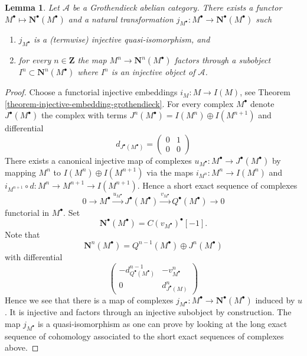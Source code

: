 \documentclass{amsart}
\theoremstyle{plain}
\newtheorem{lemma}[subsection]{Lemma}
\theoremstyle{definition}
\theoremstyle{remark}
\numberwithin{equation}{subsection}
\begin{document}
\begin{lemma}
\label{lemma-functorial-injective}
Let $\mathcal{A}$ be a Grothendieck abelian category.
There exists a functor $M^\bullet \mapsto \mathbf{N}^\bullet(M^\bullet)$
and a natural transformation
$j_{M^\bullet} : M^\bullet \to \mathbf{N}^\bullet(M^\bullet)$
such
\begin{enumerate}
\item $j_{M^\bullet}$ is a (termwise) injective quasi-isomorphism, and
\item for every $n \in \mathbf{Z}$ the map $M^n \to \mathbf{N}^n(M^\bullet)$
factors through a subobject $I^n \subset \mathbf{N}^n(M^\bullet)$ where $I^n$
is an injective object of $\mathcal{A}$.
\end{enumerate}
\end{lemma}

\begin{proof}
Choose a functorial injective embeddings $i_M : M \to I(M)$, see
Theorem \ref{theorem-injective-embedding-grothendieck}.
For every complex $M^\bullet$ denote $J^\bullet(M^\bullet)$ the complex
with terms $J^n(M^\bullet) = I(M^n) \oplus I(M^{n + 1})$ and differential
$$
d_{J^\bullet(M^\bullet)} =
\left(
\begin{matrix}
0 & 1 \\
0 & 0
\end{matrix}
\right)
$$
There exists a canonical injective map of complexes
$u_{M^\bullet} : M^\bullet \to J^\bullet(M^\bullet)$ by mapping $M^n$ to
$I(M^n) \oplus I(M^{n + 1})$ via the maps $i_{M^n} : M^n \to I(M^n)$ and
$i_{M^{n + 1}} \circ d : M^n \to M^{n + 1} \to I(M^{n + 1})$. Hence a
short exact sequence of complexes
$$
0 \to M^\bullet \xrightarrow{u_{M^\bullet}}
J^\bullet(M^\bullet) \xrightarrow{v_{M^\bullet}}
Q^\bullet(M^\bullet) \to 0
$$
functorial in $M^\bullet$. Set
$$
\mathbf{N}^\bullet(M^\bullet) = C(v_{M^\bullet})^\bullet[-1].
$$
Note that
$$
\mathbf{N}^n(M^\bullet) = Q^{n - 1}(M^\bullet) \oplus J^n(M^\bullet)
$$
with differential
$$
\left(
\begin{matrix}
- d^{n - 1}_{Q^\bullet(M^\bullet)} & - v^n_{M^\bullet} \\
0 & d^n_{J^\bullet(M)}
\end{matrix}
\right)
$$
Hence we see that there is a map of complexes
$j_{M^\bullet} : M^\bullet \to \mathbf{N}^\bullet(M^\bullet)$
induced by $u$. It is injective and factors through an injective subobject
by construction. The map $j_{M^\bullet}$ is a quasi-isomorphism as one
can prove by looking at the long exact sequence of cohomology associated
to the short exact sequences of complexes above.
\end{proof}
\end{document}
